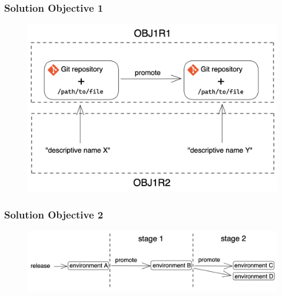 \documentclass{beamer}
\begin{document}
%
%
\begin{frame}
	\frametitle{Solution Objective 1}
	\begin{figure}[h]
		\centering
		\includegraphics[width=1.0\linewidth]{assets/OBJ1R1-and-OBJ1R2.png}
		\label{fig:OBJ1R1-and-OBJ1R2}	
	\end{figure}
\end{frame}
\begin{frame}
	\frametitle{Solution Objective 2}
	\begin{figure}[h]
		\centering
		\includegraphics[width=1.0\linewidth]{assets/OBJ2R1.png}
		\label{fig:OBJ2R1}	
	\end{figure}
\end{frame}
\end{document}
